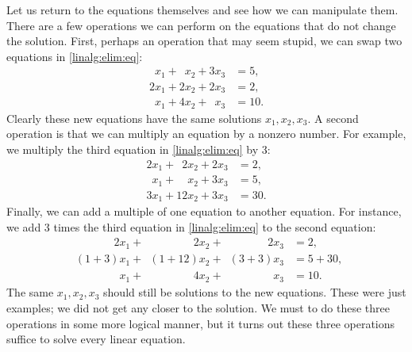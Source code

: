 \medskip

Let us return to the equations themselves and see how we can manipulate
them.
There are a few operations we can perform on the equations that do not change
the solution.  First, perhaps an operation that may seem stupid, we can swap 
two equations in \eqref{linalg:elim:eq}:
\begin{equation*}
\begin{aligned}
\phantom{9} x_1 + \phantom{9} x_2 +           3 x_3 & = 5 , \\
          2 x_1 +           2 x_2 +           2 x_3 & = 2 , \\
\phantom{9} x_1 +           4 x_2 + \phantom{9} x_3 & = 10 .
\end{aligned}
\end{equation*}
Clearly these new equations have the same solutions $x_1,x_2,x_3$.
A second operation is that we can multiply an equation by a nonzero number.  For
example, we multiply the third equation in \eqref{linalg:elim:eq}
by 3:
\begin{equation*}
\begin{aligned}
          2 x_1 + \phantom{9}  2 x_2 + 2 x_3 & = 2 , \\
\phantom{9} x_1 + \phantom{99}   x_2 + 3 x_3 & = 5 , \\
          3 x_1 +             12 x_2 + 3 x_3 & = 30 .
\end{aligned}
\end{equation*}
Finally, we can add a multiple of one equation to another equation.
For instance, we add 3 times the third equation in \eqref{linalg:elim:eq}
to the second equation:
\begin{equation*}
\begin{aligned}
\phantom{(1+3)} 2 x_1 + \phantom{(1+12)}  2 x_2 + \phantom{(3+3)} 2 x_3 & = 2 , \\
\phantom{2} (1+3) x_1 + \phantom{2}(1+12)   x_2 + \phantom{2} (3+3) x_3 & = 5+30 , \\
\phantom{2 (1+3)} x_1 + \phantom{(1+12)}  4 x_2 + \phantom{(3+3) 2} x_3 & = 10 .
\end{aligned}
\end{equation*}
The same $x_1,x_2,x_3$ should still be solutions
to the new equations.
These were just examples; we did not get any closer to the solution.
We must to do these three operations in some more logical manner,
but it turns out
these three operations suffice to solve every linear equation.

